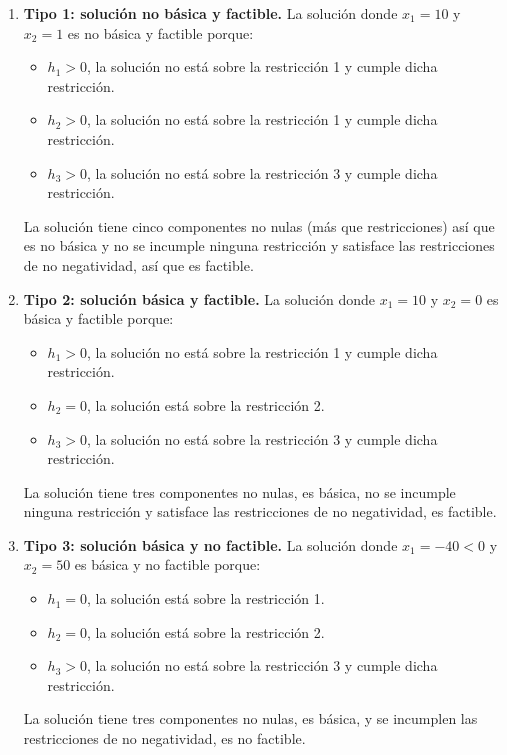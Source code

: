 \begin{enumerate}
    \item \textbf{Tipo 1: solución no básica y factible.}
    La solución donde $x_1 = 10$ y $x_2=1$ es no básica y factible porque:
    \begin{itemize}
        \item $h_1>0$, la solución no está sobre la restricción 1 y cumple dicha restricción.
        \item $h_2>0$, la solución no está sobre la restricción 1 y cumple dicha restricción.
        \item $h_3>0$, la solución no está sobre la restricción 3 y cumple dicha restricción.
    \end{itemize}
    La solución tiene cinco componentes no nulas (más que restricciones) así que es no básica y no se incumple ninguna restricción y satisface las restricciones de no negatividad, así que es factible.
    \item \textbf{Tipo 2: solución básica y factible.}
    La solución donde $x_1 = 10$ y $x_2=0$ es básica y factible porque:
    \begin{itemize}
        \item $h_1>0$, la solución no está sobre la restricción 1 y cumple dicha restricción.
        \item $h_2=0$, la solución está sobre la restricción 2.
        \item $h_3>0$, la solución no está sobre la restricción 3 y cumple dicha restricción.
    \end{itemize}
    
    La solución tiene tres componentes no nulas, es básica, no se incumple ninguna restricción y satisface las restricciones de no negatividad, es factible.
    \item \textbf{Tipo 3: solución básica y no factible.}
        La solución donde $x_1 = -40 < 0$ y $x_2=50$ es básica y no factible porque:
    \begin{itemize}
        \item $h_1=0$, la solución está sobre la restricción 1.
        \item $h_2=0$, la solución está sobre la restricción 2.
        \item $h_3>0$, la solución no está sobre la restricción 3 y cumple dicha restricción.
    \end{itemize}
    La solución tiene tres componentes no nulas, es básica, y se incumplen  las restricciones de no negatividad, es no factible.


\end{enumerate}
